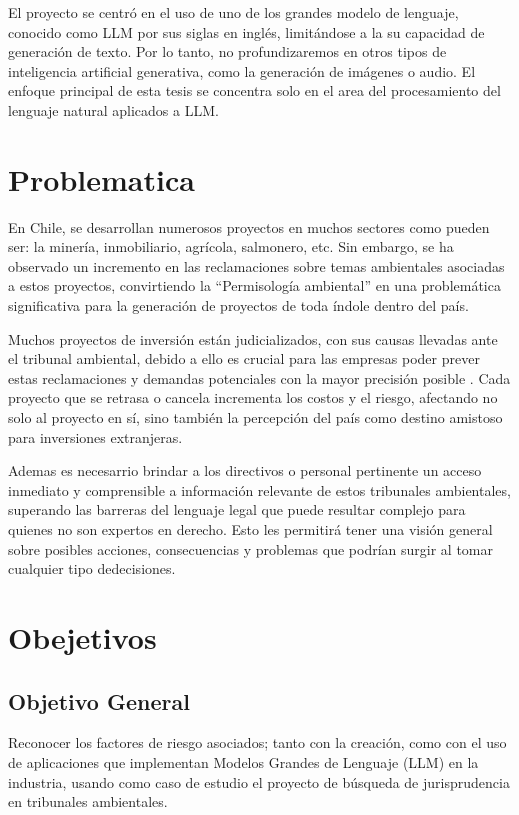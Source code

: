 El proyecto se centró en el uso de uno de los grandes modelo de lenguaje, conocido como LLM por sus siglas en inglés, limitándose a la su capacidad de 
generación de texto. Por lo tanto, no profundizaremos en otros tipos de inteligencia artificial generativa, como la 
generación de imágenes o audio. El enfoque principal de esta tesis se concentra solo en el area del procesamiento del lenguaje natural aplicados a LLM.

\newpage


\section{Problematica}

\par En Chile, se desarrollan numerosos proyectos en muchos sectores como pueden ser: la minería, inmobiliario, agrícola, salmonero, etc. Sin embargo, se ha observado un incremento en las reclamaciones 
sobre temas ambientales asociadas a estos proyectos, convirtiendo la ``Permisología ambiental'' en una problemática significativa para la generación de proyectos de toda índole dentro del país.

\par Muchos proyectos de inversión están judicializados, con sus causas llevadas ante el tribunal ambiental, debido a ello es crucial para las empresas poder prever estas reclamaciones y demandas 
potenciales con la mayor precisión posible \cite{p1}\cite{p2}\cite{p3}. Cada proyecto que se retrasa o cancela incrementa los costos y el riesgo, afectando no solo al proyecto en sí, sino también la percepción del país como 
destino amistoso para inversiones extranjeras.

\par Ademas es necesarrio brindar a los directivos o personal pertinente un acceso inmediato y comprensible a información relevante de estos tribunales ambientales, superando las 
barreras del lenguaje legal que puede resultar complejo para quienes no son expertos en derecho. Esto les permitirá tener una visión general sobre posibles acciones, consecuencias y problemas que 
podrían surgir al tomar cualquier tipo  dedecisiones.

\section{Obejetivos}
\subsection{Objetivo General}
Reconocer los factores de riesgo asociados; tanto con la creación, como con el uso de aplicaciones que implementan Modelos 
Grandes de Lenguaje (LLM) en la industria, usando como caso de estudio el proyecto de búsqueda de jurisprudencia en tribunales ambientales. 

